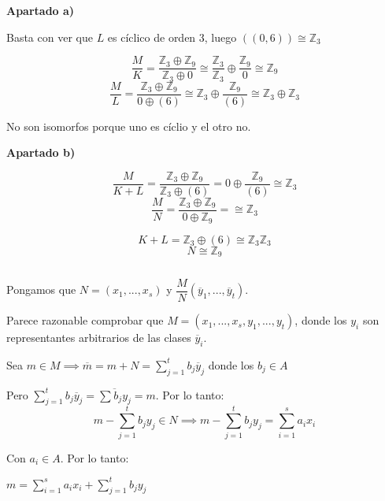 \documentclass[openany]{book}
\begin{document}
\begin{exercise}
    \begin{flushright}
        \textbf{Apartado a)}
    \end{flushright}
    
    Basta con ver que $ L$ es cíclico de orden 3, luego $ ((0,6)) \cong \mathbb{Z}_{3}$
    
    $$ \dfrac{M}{K} = \dfrac{\mathbb{Z}_{3} \oplus \mathbb{Z}_{9}}{\mathbb{Z}_{3} \oplus 0} \cong \dfrac{\mathbb{Z}_{3}}{\mathbb{Z}_{3}} \oplus \dfrac{\mathbb{Z}_{9}}{0} \cong \mathbb{Z}_{9} $$
    $$ \dfrac{M}{L} = \dfrac{\mathbb{Z}_{3}\oplus \mathbb{Z}_{9}}{0 \oplus (6)} \cong \mathbb{Z}_{3} \oplus \dfrac{\mathbb{Z}_{9}}{(6)} \cong \mathbb{Z}_{3} \oplus \mathbb{Z}_{3} $$

    No son isomorfos porque uno es cíclio y el otro no.
    
    \begin{flushright}
        \textbf{Apartado b)}
    \end{flushright}

    $$ \dfrac{M}{K+L} = \dfrac{\mathbb{Z}_{3}\oplus \mathbb{Z}_{9}}{\mathbb{Z}_{3}\oplus (6)} = 0 \oplus \dfrac{\mathbb{Z}_{9}}{(6)} \cong \mathbb{Z}_{3} $$
    $$ \dfrac{M}{N} = \dfrac{\mathbb{Z}_{3}\oplus \mathbb{Z}_{9}}{0 \oplus \mathbb{Z}_{9}} =\cong \mathbb{Z}_{3} $$


    $$ K+L = \mathbb{Z}_{3} \oplus (6) \cong \mathbb{Z}_{3} \mathbb{Z}_{3} $$
    $$ N \cong \mathbb{Z}_{9} $$


\end{exercise}

\setcounter{ex}{9}

\begin{exercise}
    $ $

    Pongamos que $ N = (x_1,...,x_s)$ y $ \dfrac{M}{N}(\overline{y}_{1},...,\overline{y}_{t})$.
    
    Parece razonable comprobar que $ M = (x_1,...,x_s,y_1,...,y_t)$, donde los $ y_i$ son representantes arbitrarios de las clases $\overline{y}_{i} $.

    Sea $ m \in M \implies \overline{m} = m+N = \sum\limits_{j=1}^{t}b_j \overline{y}_{j}$ donde los $ b_j \in A$

    Pero $ \sum\limits_{j=1}^{t}b_j \overline{y}_{j} = \overline{\sum\limits_{}^{}b_j y_j} = m $. Por lo tanto:
    $$ m - \sum\limits_{j=1}^{t} b_j y_j \in N \implies m- \sum\limits_{j=1}^{t}b_jy_j = \sum\limits_{i=1}^{s} a_ix_i $$

    Con $ a_i \in A$. Por lo tanto:

    $ m = \sum\limits_{i=1}^{s}a_ix_i + \sum\limits_{j=1}^{t}b_jy_j$

\end{exercise}
\end{document}
